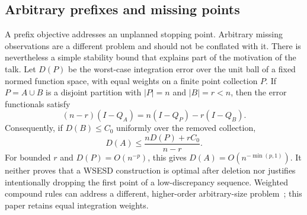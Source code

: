 \subsection{Arbitrary prefixes and missing points}
A prefix objective addresses an unplanned stopping point. Arbitrary missing
observations are a different problem and should not be conflated with it.
There is nevertheless a simple stability bound that explains part of the
motivation of the talk. Let $D(P)$ be the worst-case integration error over
the unit ball of a fixed normed function space, with equal weights on a
finite point collection $P$. If $P=A\cup B$ is a disjoint partition with
$|P|=n$ and $|B|=r<n$, then the error functionals satisfy
\[
 (n-r)(I-Q_A)=n(I-Q_P)-r(I-Q_B).
\]
Consequently, if $D(B)\le C_0$ uniformly over the removed collection,
\begin{equation}\label{eq:removal}
 D(A)\le\frac{nD(P)+rC_0}{n-r}.
\end{equation}
For bounded $r$ and $D(P)=O(n^{-p})$, this gives
$D(A)=O(n^{-\min(p,1)})$. It neither proves that a WSESD construction
is optimal after deletion nor justifies intentionally dropping the first
point of a low-discrepancy sequence. Weighted compound rules can address a
different, higher-order arbitrary-size problem~\cite{HKKN12}; this paper
retains equal integration weights.


\par\smallskip
\noindent{}
\par\smallskip
